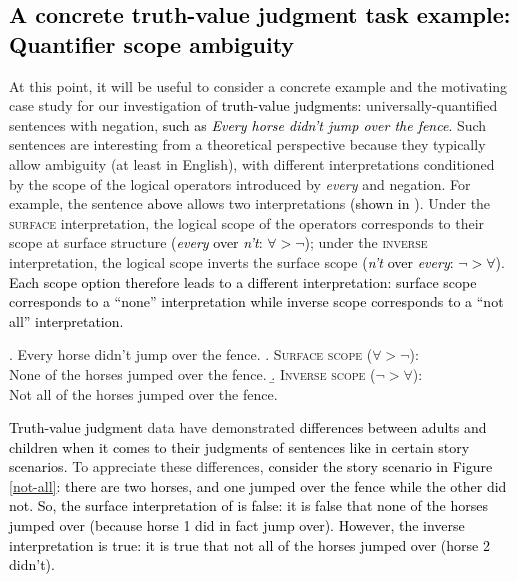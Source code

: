 \documentclass[cm]{glossa}
\newcommand{\lp}[1]{\textcolor{black}{#1}} %
\begin{document}
\subsection{\lp{A concrete truth-value judgment task example: Quantifier scope ambiguity}}

At this point, \lp{it} will be useful to consider a concrete example and the motivating case study for our investigation of 
\lp{truth-value judgments:}
universally-quantified sentences with negation, 
\lp{such as \textit{Every horse didn't jump over the fence}}. Such sentences are interesting from a theoretical perspective because they typically allow ambiguity (at least in English), with different interpretations conditioned by the scope of the logical operators introduced by \emph{every} and negation. For example, the sentence
\lp{above}
 allows two interpretations 
 \lp{(shown in \Next)}. Under the \textsc{surface} interpretation, the logical scope of the operators corresponds to their scope at surface structure \lp{(\textit{every} over \textit{n't}: $\forall > \neg$)}; under the \textsc{inverse} interpretation, the logical scope inverts the surface scope
 \lp{(\textit{n't} over \textit{every}: $\neg > \forall$)}.
 \lp{Each scope option therefore leads to a different interpretation: 
 surface scope corresponds to a ``none'' interpretation while 
 inverse scope corresponds to a ``not all'' interpretation.}

\ex. \label{every-not}
Every horse didn't jump over the fence.
\a. \label{every-not-surface}
\textsc{Surface scope} ($\forall > \neg$):\\
None of the horses jumped over the fence.
\b. \label{every-not-inverse}
\textsc{Inverse scope} ($\neg > \forall$):\\
Not all of the horses jumped over the fence. 


\lp{Truth-value judgment}
data have demonstrated 
\lp{differences between adults and children when it comes to
their judgments of sentences like \Last in certain story scenarios.}
To appreciate these differences, \lp{consider the story scenario in Figure \ref{not-all}: there are two horses, and one jumped over the fence while the other did not. So, the surface interpretation of \Last is false: it is false that none of the horses jumped over (because horse 1 did in fact jump over).
However, the inverse interpretation is true: it is true that not all of the horses jumped over (horse 2 didn't).}
\end{document}
